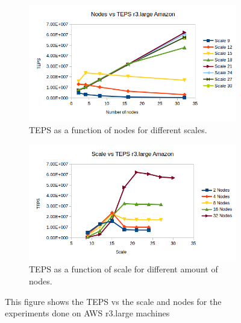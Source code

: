 \begin{figure}[!h]
	\centering
	\begin{subfigure}{.5\textwidth}
		\centering
		\includegraphics[width=\linewidth]{images/nodes_r3_amazon.png}
		\caption{TEPS as a function of nodes for different scales.}
		\label{fig:nodes_r3_amazon}
	\end{subfigure}%
	\begin{subfigure}{.5\textwidth}
		\centering
		\includegraphics[width=\linewidth]{images/scale_r3_amazon.png}
		\caption{TEPS as a function of scale for different amount of nodes.}
		\label{fig:scale_r3_amazon}
	\end{subfigure}
	\caption{This figure shows the TEPS vs the scale and nodes for the experiments done on AWS r3.large machines}
	\label{fig:r3_amazon}
\end{figure}
